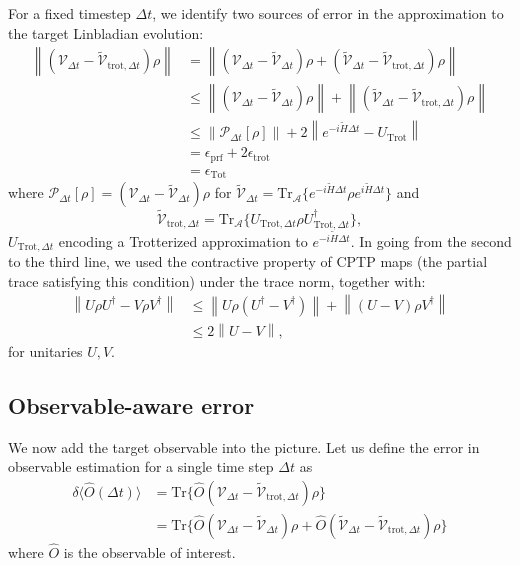 \documentclass[11pt]{article}
\newcommand{\calV}{\mathcal{V}}
\newcommand{\Dt}{\Delta t}
\newcommand{\norm}[1]{\left\lVert #1 \right\rVert}
\begin{document}
For a fixed timestep $\Dt$, we identify two sources of error in the approximation to the target Linbladian evolution:
\begin{align}\label{eq:err_deltT}
    \norm{\left(\calV_{\Dt}-\tilde{\calV}_{\text{trot},\Dt}\right)\rho} &= \norm{\left(\calV_{\Dt}-\tilde{\calV}_{\Dt}\right)\rho+\left(\tilde{\calV}_{\Dt}-\tilde{\calV}_{\text{trot},\Dt}\right)\rho}\\
    &\le \norm{\left(\calV_{\Dt}-\tilde{\calV}_{\Dt}\right)\rho}+\norm{\left(\tilde{\calV}_{\Dt}-\tilde{\calV}_{\text{trot},\Dt}\right)\rho}\\
    &\le \norm{\mathcal{P}_{\Dt}[\rho]}+2\norm{e^{-i\tilde{H}\Dt}-U_{\text{Trot}}}\\
    &=\epsilon_{\text{prf}}+2\epsilon_{\text{trot}}\\
    &=\epsilon_{\text{Tot}}
\end{align}
where $\mathcal{P}_{\Dt}[\rho]=\left(\calV_{\Dt}-\tilde{\calV}_{\Dt}\right)\rho$ for $\tilde{\calV}_{\Dt} = \text{Tr}_{\mathcal{A}}\{e^{-i\tilde{H}\Dt}\rho e^{i\tilde{H}\Dt}\}$ and 
\begin{equation}
\tilde{\calV}_{\text{trot},\Dt} = \text{Tr}_{\mathcal{A}}\{U_{\text{Trot},\Dt}\rho U^{\dagger}_{\text{Trot},\Dt}\},
\end{equation}
 $U_{\text{Trot},\Dt}$ encoding a Trotterized approximation to $e^{-i\tilde{H}\Dt}$. In going from the second to the third line, we used the contractive property of CPTP maps (the partial trace satisfying this condition) under the trace norm, together with:
 \begin{align}
     \norm{U\rho U^{\dagger}-V\rho V^{\dagger}}&\le \norm{U\rho\left(U^\dagger-V^{\dagger}\right)}+\norm{\left(U-V\right)\rho V^{\dagger}}\\
     &\le 2 \norm{U-V},
 \end{align}
 for unitaries $U,V$.
 \subsection{Observable-aware error}
 We now add the target observable into the picture. Let us define the error in 
 observable estimation for a single time step $\Dt$ as
 \begin{align}
    \delta\langle\hat{O}(\Dt)\rangle &= \text{Tr}\{\hat{O}\left(\calV_{\Dt}-\tilde{\calV}_{\text{trot},\Dt}\right)\rho\}\\
    &=\text{Tr}\{ \hat{O}\left(\calV_{\Dt}-\tilde{\calV}_{\Dt}\right)\rho+\hat{O}\left(\tilde{\calV}_{\Dt}-\tilde{\calV}_{\text{trot},\Dt}\right)\rho\}
 \end{align}
 where $\hat{O}$ is the observable of interest.
\end{document}
